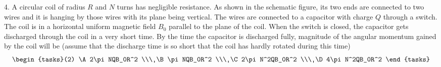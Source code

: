  4. A circular coil of radius \(R\) and \(N\) turns has negligible resistance. As shown in the schematic figure, its two ends are connected to two wires and it is hanging by those wires with its plane being vertical. The wires are connected to a capacitor with charge \(Q\) through a switch. The coil is in a horizontal uniform magnetic field \(B_0\) parallel to the plane of the coil. When the switch is closed, the capacitor gets discharged through the coil in a very short time. By the time the capacitor is discharged fully, magnitude of the angular momentum gained by the coil will be (assume that the discharge time is so short that the coil has hardly rotated during this time)
$$\begin{tasks}(2)
\A 2\pi NQB_0R^2 \\\
\B \pi NQB_0R^2 \\\
\C 2\pi N^2QB_0R^2 \\\
\D 4\pi N^2QB_0R^2
\end{tasks}$$